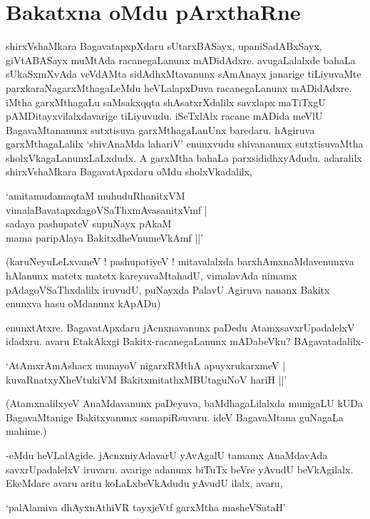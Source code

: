 \chapter{Bakatxna oMdu pArxthaRne}\label{chap11}

shirxVshaMkara BagavatapxpXdaru sUtarxBASayx, upaniSadABxSayx, giVtABASayx muMtAda racanegaLanunx mADidAdxre. avugaLalalxde bahaLa sUkaSxmXvAda veVdAMta sidAdhxMtavanunx sAmAnayx janarige tiLiyuvaMte parxkaraNagarxMthagaLeMdu heVLalapxDuva racanegaLanunx mADidAdxre. iMtha garxMthagaLu saMsakxqqta shAsatxrXdalilx savxlapx maTiTxgU pAMDitayxvilalxdavarige tiLiyuvudu. iSeTxlAlx racane mADida meVlU BagavaMtananunx sutxtisuva garxMthagaLanUnx baredaru. hAgiruva garxMthagaLalilx `shivAnaMda lahariV' enunxvudu shivananunx sutxtisuvaMtha sholxVkagaLanunxLaLxdudx. A garxMtha bahaLa parxsididhxyAdudu. adaralilx shirxVshaMkara BagavatApxdaru oMdu sholxVkadalilx,

\begin{shloka}
`amitamudamaqtaM muhuduRhanitxVM\\
vimalaBavatapxdagoVSaThxmAvasanitxVmf |\\
sadaya pashupateV supuNayx pAkaM\\
mama paripAlaya BakitxdheVnumeVkAmf ||'
\end{shloka}

(karuNeyuLeLxvaneV ! pashupatiyeV ! mitavalalxda barxhAmxnaMdavenunxva hAlanunx matetx matetx kareyuvaMtahadU, vimalavAda nimamx pAdagoVSaThxdalilx iruvudU, puNayxda PalavU Agiruva nananx Bakitx enunxva hasu oMdanunx kApADu)

enunxtAtxre. BagavatApxdaru jAcnxnavanunx paDedu AtamxsavxrUpadalelxV idadxru. avaru EtakAkxgi Bakitx-racanegaLanunx mADabeVku? BAgavatadalilx-

\begin{shloka}
`AtAmxrAmAshacx munayoV nigarxRMthA apuyxrukarxmeV |\\
kuvaRnatxyXheVtukiVM BakitxmitathxMBUtaguNoV hariH ||'
\end{shloka}

(AtamxnalilxyeV AnaMdavanunx paDeyuva, baMdhagaLilalxda munigaLU kUDa BagavaMtanige Bakitxyanunx samapiRsuvaru. ideV BagavaMtana guNagaLa mahime.)

-eMdu heVLalAgide. jAcnxniyAdavarU yAvAgalU tamamx AnaMdavAda savxrUpadalelxV iruvaru. avarige adanunx biTuTx beVre yAvudU beVkAgilalx. EkeMdare avaru aritu koLaLxbeVkAdudu yAvudU ilalx, avaru,

\begin{shloka}
`palAlamiva dhAyxnAthiVR tayxjeVtf garxMtha masheVSataH'
\end{shloka}

